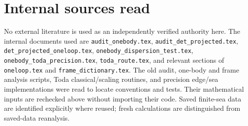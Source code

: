 \documentclass[11pt,a4paper]{article}
\begin{document}
\section{Internal sources read}\label{sec:sources}
No external literature is used as an independently verified authority here.
The internal documents used are \texttt{audit\_onebody.tex},
\texttt{audit\_det\_projected.tex}, \texttt{det\_projected\_oneloop.tex},
\texttt{onebody\_dispersion\_test.tex}, \texttt{onebody\_toda\_precision.tex},
\texttt{toda\_route.tex}, and relevant sections of \texttt{oneloop.tex}
and \texttt{frame\_dictionary.tex}. The old audit, one-body and frame
analysis scripts, Toda classical/scaling routines, and precision edge/sea
implementations were read to locate conventions and tests. Their
mathematical inputs are rechecked above without importing their code.
Saved finite-sea data are identified explicitly where reused; fresh
calculations are distinguished from saved-data reanalysis.
\end{document}

